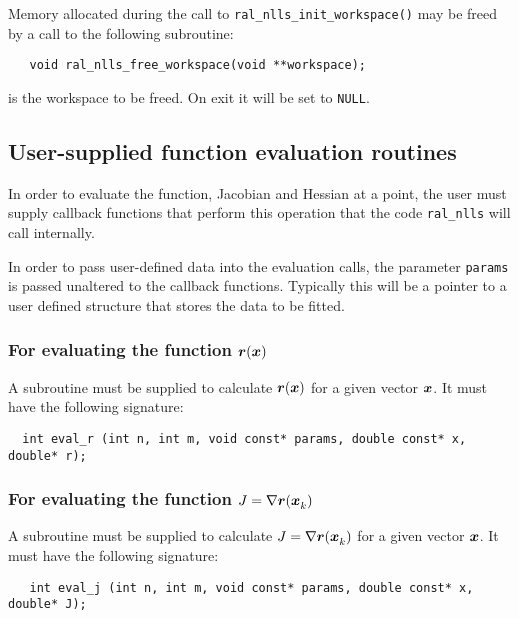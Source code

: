 \documentclass{spec}
\begin{document}
Memory allocated during the call to \texttt{ral\_nlls\_init\_workspace()} may be freed
by a call to the following subroutine:
\begin{verbatim}
   void ral_nlls_free_workspace(void **workspace);
\end{verbatim}

\begin{description}
    is the workspace to be freed. On exit it will be set to \texttt{NULL}.
\end{description}


\subsection{User-supplied function evaluation routines}
\label{sec::function_eval}
In order to evaluate the function, Jacobian and Hessian at a point, the user
must supply callback functions that perform this operation that the code
{\tt ral\_nlls} will call internally.

In order to pass user-defined data into the evaluation calls, the parameter
\texttt{params} is passed unaltered to the callback functions. Typically this
will be a pointer to a user defined structure that stores the data to be fitted.

\subsubsection{For evaluating the function ${\bm r}({\bm x})$}

A subroutine must be supplied to calculate ${\bm r}({\bm x})$ for a given vector ${\bm x}$. 
It must have the following signature:
\begin{verbatim}
  int eval_r (int n, int m, void const* params, double const* x, double* r);
\end{verbatim}



\subsubsection{For evaluating the function $J = \nabla {\bm r}({\bm x}_{k}^{})$}
A subroutine must be supplied to calculate $J = \nabla {\bm r}({\bm x}_{k}^{})$ for a given vector ${\bm x}$. It must have the following signature:

\begin{verbatim}
   int eval_j (int n, int m, void const* params, double const* x, double* J);
\end{verbatim}
\end{document}
